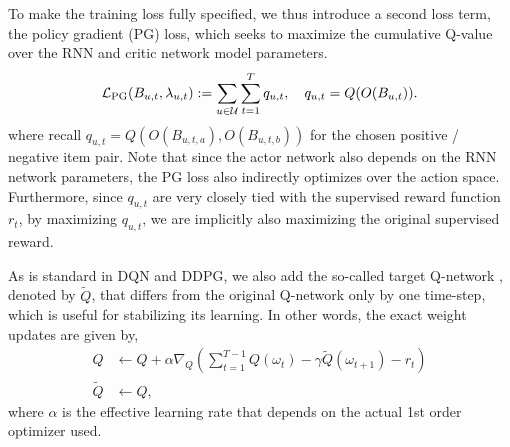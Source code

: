 To make the training loss fully specified, we thus introduce a second loss term, the policy gradient (PG) loss, which seeks to maximize the cumulative Q-value over the RNN and critic network model parameters. 
\begin{align}
    \mathcal{L}_{\text{PG}}(B_{u, t}, \lambda_{u, t}) := \sum_{u \in \mathcal{U}} \sum_{t=1}^T q_{u, t}, \quad q_{u, t} = Q(O(B_{u, t})).
\end{align}
where recall $q_{u, t} = Q(O(B_{u, t, a}), O(B_{u, t, b}))$ for the chosen positive / negative item pair. Note that since the actor network also depends on the RNN network parameters, the PG loss also indirectly optimizes over the action space. Furthermore, since $q_{u, t}$ are very closely tied with the supervised reward function $r_t$, by maximizing $q_{u, t}$, we are implicitly also maximizing the original supervised reward.




As is standard in DQN and DDPG, we also add the so-called target Q-network \cite{mnih2015human}, denoted by $\tilde{Q}$, that differs from the original Q-network only by one time-step, which is useful for stabilizing its learning. In other words, the exact weight updates are given by,
\begin{align}
    Q &\leftarrow Q + \alpha \nabla_Q (\sum_{t = 1}^{T - 1} Q(\omega_t) - \gamma \tilde{Q}(\omega_{t+1}) - r_t) \\
    \tilde{Q} &\leftarrow Q ,
\end{align}
where $\alpha$ is the effective learning rate that depends on the actual 1st order optimizer used.


